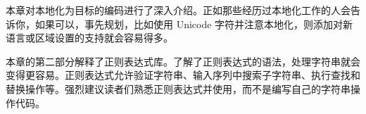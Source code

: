 本章对本地化为目标的编码进行了深入介绍。正如那些经历过本地化工作的人会告诉你，如果可以，事先规划，比如使用 Unicode 字符并注意本地化，则添加对新语言或区域设置的支持就会容易得多。

本章的第二部分解释了正则表达式库。了解了正则表达式的语法，处理字符串就会变得更容易。正则表达式允许验证字符串、输入序列中搜索子字符串、执行查找和替换操作等。强烈建议读者们熟悉正则表达式并使用，而不是编写自己的字符串操作代码。